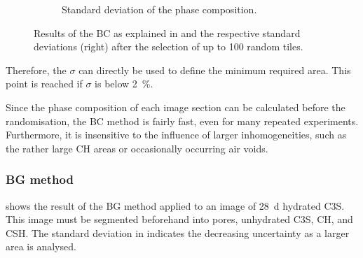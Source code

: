 \begin{figure}[H]
\begin{subfigure}[t]{0.49\linewidth}
      \caption{Standard deviation of the phase composition.}
      \label{fig:lit_box_count_b}
    \end{subfigure}
    \caption{
        Results of the \ac{BC} as explained in \cite{mouret.2001,hlavacek.2015} and the respective standard deviations (right) after the selection of up to \num{100} random tiles.
    }
    \label{fig:lit_box_count}
\end{figure}

Therefore, the $\sigma$ can directly be used to define the minimum required area.
This point is reached if $\sigma$ is below \qty{2}{\percent}.

Since the phase composition of each image section can be calculated before the randomisation, the \ac{BC} method is fairly fast, even for many repeated experiments.
Furthermore, it is insensitive to the influence of larger inhomogeneities, such as the rather large \ac{CH} areas or occasionally occurring air voids.


\subsubsection[Box growth method]{\Acl*{BG} method}

 shows the result of the \ac{BG} method applied to an image of \qty{28}{\day} hydrated \ac{C3S}.
This image must be segmented beforehand into pores, unhydrated \ac{C3S}, \ac{CH}, and \ac{CSH}.
The standard deviation in  indicates the decreasing uncertainty as a larger area is analysed.


